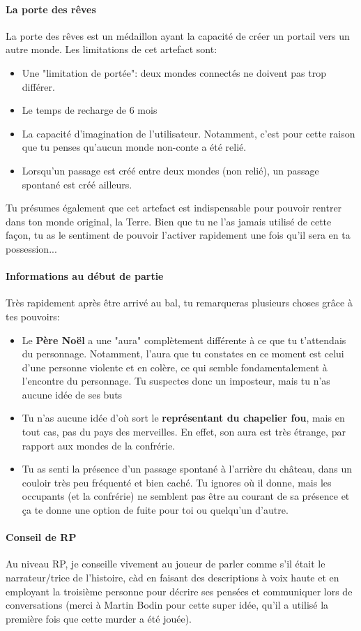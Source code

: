 {	\paragraph{La porte des rêves} La porte des rêves est un médaillon ayant la capacité de créer un portail vers un autre monde. Les limitations de cet artefact sont:
	\begin{itemize}
		\item Une "limitation de portée": deux mondes connectés ne doivent pas trop différer.
		\item Le temps de recharge de 6 mois
		\item La capacité d'imagination de l'utilisateur. Notamment, c'est pour cette raison que tu penses qu'aucun monde non-conte a été relié.
		\item Lorsqu'un passage est créé entre deux mondes (non relié), un passage spontané est créé ailleurs.
	\end{itemize}
	Tu présumes également que cet artefact est indispensable pour pouvoir rentrer dans ton monde original, la Terre. Bien que tu ne l'as jamais utilisé de cette façon, tu as le sentiment de pouvoir l'activer rapidement une fois qu'il sera en ta possession...
	
	\paragraph{Informations au début de partie} Très rapidement après être arrivé au bal, tu remarqueras plusieurs choses grâce à tes pouvoirs:
	\begin{itemize}
		\item Le \textbf{Père Noël} a une "aura" complètement différente à ce que tu t'attendais du personnage. Notamment, l'aura que tu constates en ce moment est celui d'une personne violente et en colère, ce qui semble fondamentalement à l'encontre du personnage. Tu suspectes donc un imposteur, mais tu n'as aucune idée de ses buts
		\item Tu n'as aucune idée d'où sort le \textbf{représentant du chapelier fou}, mais en tout cas, pas du pays des merveilles. En effet, son aura est très étrange, par rapport aux mondes de la confrérie.
		\item Tu as senti la présence d'un passage spontané à l'arrière du château, dans un couloir très peu fréquenté et bien caché. Tu ignores où il donne, mais les occupants (et la confrérie) ne semblent pas être au courant de sa présence et ça te donne une option de fuite pour toi ou quelqu'un d'autre.
	\end{itemize}
	
	\paragraph{Conseil de RP} Au niveau RP, je conseille vivement au joueur de parler comme s'il était le narrateur/trice de l'histoire, càd en faisant des descriptions à voix haute et en employant la troisième personne pour décrire ses pensées et communiquer lors de conversations (merci à Martin Bodin pour cette super idée, qu'il a utilisé la première fois que cette murder a été jouée).
}


